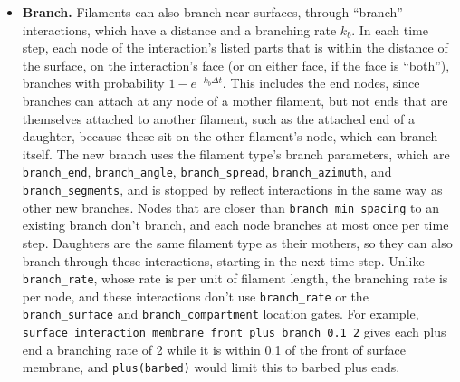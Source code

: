 \documentclass {scrbook}
\newcommand {\ttt} {\texttt}
\begin{document}
\begin{itemize}
Nodes can also adsorb and desorb on their own, through ``adsorb'' and ``desorb'' interactions. In each time step, each free node of an adsorb interaction's listed parts that is within the interaction's capture distance of the surface, on the interaction's face (or on either face, if the face is ``both''), adsorbs with probability $1-e^{-k_a\Delta t}$, where $k_a$ is the adsorption rate. It then moves to the closest point of the surface, as for \ttt{adsorb\_node}, with the interaction's lateral mobility factor. Likewise, each adsorbed node of a desorb interaction's listed parts that is adsorbed to its surface, on its face (or either face for ``both''), desorbs with probability $1-e^{-k_d\Delta t}$, where $k_d$ is the desorption rate, and is then placed at the interaction's offset distance from the surface, on the side that it was adsorbed to. A node that desorbs in a time step doesn't also adsorb in that time step, and the attached end of a filament that is rigidly attached to its mother doesn't adsorb. Adsorption and desorption occur after the filament mechanics in each time step, and they also apply to filaments without dynamics. For a node that stays within the capture distance, as for a filament without dynamics and an offset of 0, the fraction of time that the node is adsorbed is $p_a/(p_a+p_d)$, where $p_a$ and $p_d$ are the adsorption and desorption probabilities per time step, which is about $k_a/(k_a+k_d)$ for short time steps. The \ttt{S13\_filaments/dynamics/adsorbDesorb3D.txt} example shows these interactions.

\item \textbf{Branch.} Filaments can also branch near surfaces, through ``branch'' interactions, which have a distance and a branching rate $k_b$. In each time step, each node of the interaction's listed parts that is within the distance of the surface, on the interaction's face (or on either face, if the face is ``both''), branches with probability $1-e^{-k_b\Delta t}$. This includes the end nodes, since branches can attach at any node of a mother filament, but not ends that are themselves attached to another filament, such as the attached end of a daughter, because these sit on the other filament's node, which can branch itself. The new branch uses the filament type's branch parameters, which are \ttt{branch\_end}, \ttt{branch\_angle}, \ttt{branch\_spread}, \ttt{branch\_azimuth}, and \ttt{branch\_segments}, and is stopped by reflect interactions in the same way as other new branches. Nodes that are closer than \ttt{branch\_min\_spacing} to an existing branch don't branch, and each node branches at most once per time step. Daughters are the same filament type as their mothers, so they can also branch through these interactions, starting in the next time step. Unlike \ttt{branch\_rate}, whose rate is per unit of filament length, the branching rate is per node, and these interactions don't use \ttt{branch\_rate} or the \ttt{branch\_surface} and \ttt{branch\_compartment} location gates. For example, \ttt{surface\_interaction membrane front plus branch 0.1 2} gives each plus end a branching rate of 2 while it is within 0.1 of the front of surface membrane, and \ttt{plus(barbed)} would limit this to barbed plus ends.
\end{itemize}
\end{document}

